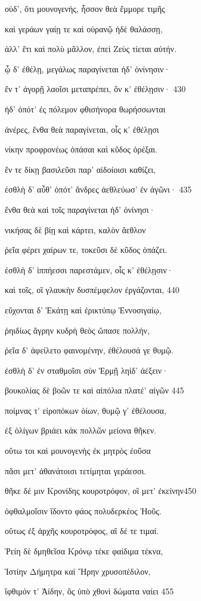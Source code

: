 οὐδ', ὅτι μουνογενής, ἧσσον θεὰ ἔμμορε τιμῆς 

καὶ γεράων γαίῃ τε καὶ οὐρανῷ ἠδὲ θαλάσσῃ, 

ἀλλ' ἔτι καὶ πολὺ μᾶλλον, ἐπεὶ Ζεὺς τίεται αὐτήν.

ᾧ δ' ἐθέλῃ, μεγάλως παραγίνεται ἠδ' ὀνίνησιν· 

ἔν τ' ἀγορῇ λαοῖσι μεταπρέπει, ὅν κ' ἐθέλῃσιν· \num{430} 

ἠδ' ὁπότ' ἐς πόλεμον φθισήνορα θωρήσσωνται

ἀνέρες, ἔνθα θεὰ παραγίνεται, οἷς κ' ἐθέλῃσι

νίκην προφρονέως ὀπάσαι καὶ κῦδος ὀρέξαι.

ἔν τε δίκῃ βασιλεῦσι παρ' αἰδοίοισι καθίζει,

ἐσθλὴ δ' αὖθ' ὁπότ' ἄνδρες ἀεθλεύωσ' ἐν ἀγῶνι· \num{435}

ἔνθα θεὰ καὶ τοῖς παραγίνεται ἠδ' ὀνίνησι· 

νικήσας δὲ βίῃ καὶ κάρτει, καλὸν ἄεθλον 

ῥεῖα φέρει χαίρων τε, τοκεῦσι δὲ κῦδος ὀπάζει.

ἐσθλὴ δ' ἱππήεσσι παρεστάμεν, οἷς κ' ἐθέλῃσιν·

καὶ τοῖς, οἳ γλαυκὴν δυσπέμφελον ἐργάζονται, \num{440}

εὔχονται δ' Ἑκάτῃ καὶ ἐρικτύπῳ Ἐννοσιγαίῳ,

ῥηιδίως ἄγρην κυδρὴ θεὸς ὤπασε πολλήν,

ῥεῖα δ' ἀφείλετο φαινομένην, ἐθέλουσά γε θυμῷ.

ἐσθλὴ δ' ἐν σταθμοῖσι σὺν Ἑρμῇ ληίδ' ἀέξειν· 

βουκολίας δὲ βοῶν τε καὶ αἰπόλια πλατέ' αἰγῶν \num{445}

ποίμνας τ' εἰροπόκων ὀίων, θυμῷ γ' ἐθέλουσα,

ἐξ ὀλίγων βριάει κἀκ πολλῶν μείονα θῆκεν.

οὕτω τοι καὶ μουνογενὴς ἐκ μητρὸς ἐοῦσα

πᾶσι μετ' ἀθανάτοισι τετίμηται γεράεσσι. 

θῆκε δέ μιν Κρονίδης κουροτρόφον, οἳ μετ' ἐκείνην\num{450}

ὀφθαλμοῖσιν ἴδοντο φάος πολυδερκέος Ἠοῦς.

οὕτως ἐξ ἀρχῆς κουροτρόφος, αἳ δέ τε τιμαί.

Ῥείη δὲ δμηθεῖσα Κρόνῳ τέκε φαίδιμα τέκνα, 

Ἱστίην Δήμητρα καὶ Ἥρην χρυσοπέδιλον, 

ἴφθιμόν τ' Ἀίδην, ὃς ὑπὸ χθονὶ δώματα ναίει \num{455}


